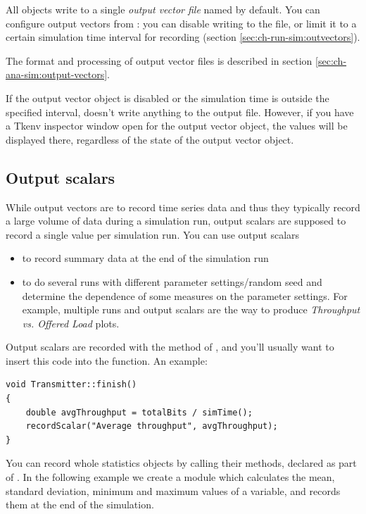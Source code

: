 All  objects write to a single \textit{output vector file}
named  by default.
You can configure output vectors from :
you can disable writing to the file, or limit it to a certain
simulation time interval for recording (section
\ref{sec:ch-run-sim:outvectors}).

The format and processing of output vector files is described in section
\ref{sec:ch-ana-sim:output-vectors}.

If the output vector object is disabled or the simulation time is
outside the specified interval,  doesn't write
anything to the output file. However, if you have a Tkenv inspector
window open for the output vector object,
the values will be displayed there, regardless of the state of the
output vector object.



\subsection{Output scalars}

While output vectors are to record time series data and thus they
typically record a large volume of data during a simulation run,
output scalars are supposed to record a single
value per simulation run. You can use output scalars

\begin{itemize}
\item{to record summary data at the end of the simulation run}
\item{to do several runs with different parameter settings/random seed
    and determine the dependence of some measures on the parameter
    settings. For example, multiple runs and output scalars are the
    way to produce \textit{Throughput vs. Offered Load} plots.}
\end{itemize}

Output scalars are recorded with the  method of
, and you'll usually want to insert this code
into the  function. An example:

\begin{verbatim}
void Transmitter::finish()
{
    double avgThroughput = totalBits / simTime();
    recordScalar("Average throughput", avgThroughput);
}
\end{verbatim}

You can record whole statistics objects by calling their 
methods, declared as part of . In the following example
we create a  module which calculates the mean, standard
deviation, minimum and maximum values of a variable, and records them at the
end of the simulation.

